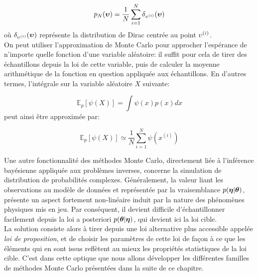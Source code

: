 \begin{equation}
p_N({\bm{\upsilon}}) = \dfrac{1}{N} \sum\limits_{i=1}^N\delta_{{\upsilon}^{(i)}}({\bm{\upsilon}})
\label{eq_approximation_MC}
\end{equation}
où $\delta_{{\upsilon}^{(i)}}({\bm{\upsilon}})$ représente la distribution de Dirac centrée au point ${\upsilon}^{(i)}$. \\

On peut utiliser l'approximation de Monte Carlo pour approcher l'espérance de n'importe quelle fonction d'une variable aléatoire: il suffit pour cela de tirer des échantillons depuis la loi de cette variable, puis de calculer la moyenne arithmétique de la fonction en question appliquée aux échantillons. En d'autres termes, l'intégrale sur la variable aléatoire $X$ suivante:

\begin{equation}
{
\mathbb{E}_p [\psi(X)] = \int \psi(x) p(x)dx
\label{eq_integrale_MC_intractable}
}
\end{equation}
peut ainsi être approximée par:

\begin{equation}
{
\mathbb{E}_p[\psi(X)] \simeq \dfrac{1}{N}\sum\limits_{i=1}^N \psi(x^{(i)})
\label{eq_integrale_MC_approximation}
}
\end{equation}

Une autre fonctionnalité des méthodes Monte Carlo, directement liée à l'inférence bayésienne appliquée aux problèmes inverses, concerne la simulation de distribution de probabilités complexes. Généralement, la valeur liant les observations au modèle de données et représentée par la vraisemblance $p({\bm{\eta}} |{\bm{\theta}})$, présente un aspect fortement non-linéaire induit par la nature des phénomènes physiques mis en jeu. Par conséquent, il devient difficile d'échantillonner facilement depuis la loi a posteriori ${p({\bm{\theta}} | {\bm{\eta}})}$, qui devient ici la loi cible.\\

La solution consiste alors à tirer depuis une loi alternative plus accessible appelée \textit{loi de proposition}, et de choisir les paramètres de cette loi de façon à ce que les éléments qui en sont issus reflètent au mieux les propriétés statistiques de la loi cible. C'est dans cette optique que nous allons développer les différentes familles de méthodes Monte Carlo présentées dans la suite de ce chapitre.\\


